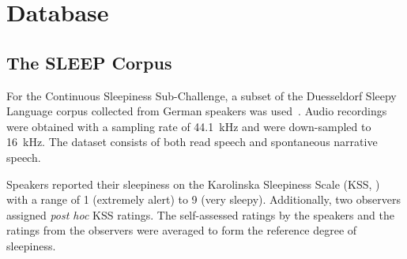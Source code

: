 \section{Database}

\subsection{The SLEEP Corpus}

For the Continuous Sleepiness Sub-Challenge, a subset of the Duesseldorf Sleepy Language corpus collected from German speakers was used~\cite{schullerinterspeech}. Audio recordings were obtained with a sampling rate of 44.1~kHz and were down-sampled to 16~kHz. %
The dataset consists of both read speech and spontaneous narrative speech. 

Speakers reported their sleepiness on the Karolinska Sleepiness Scale (KSS, \cite{aakerstedt1990subjective}) with a range of 1 (extremely alert) to 9 (very sleepy). Additionally, two observers assigned \textit{post hoc} KSS ratings.  
The self-assessed ratings by the speakers and the ratings from the observers were averaged to form the reference degree of sleepiness. 



